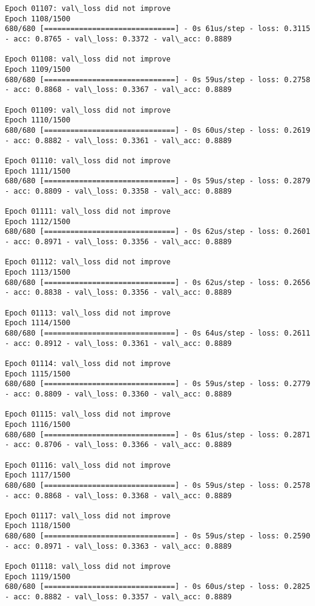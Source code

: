 \documentclass[11pt]{article}
\begin{document}
\begin{Verbatim}[commandchars=\\\{\}]
Epoch 01107: val\_loss did not improve
Epoch 1108/1500
680/680 [==============================] - 0s 61us/step - loss: 0.3115 - acc: 0.8765 - val\_loss: 0.3372 - val\_acc: 0.8889

Epoch 01108: val\_loss did not improve
Epoch 1109/1500
680/680 [==============================] - 0s 59us/step - loss: 0.2758 - acc: 0.8868 - val\_loss: 0.3367 - val\_acc: 0.8889

Epoch 01109: val\_loss did not improve
Epoch 1110/1500
680/680 [==============================] - 0s 60us/step - loss: 0.2619 - acc: 0.8882 - val\_loss: 0.3361 - val\_acc: 0.8889

Epoch 01110: val\_loss did not improve
Epoch 1111/1500
680/680 [==============================] - 0s 59us/step - loss: 0.2879 - acc: 0.8809 - val\_loss: 0.3358 - val\_acc: 0.8889

Epoch 01111: val\_loss did not improve
Epoch 1112/1500
680/680 [==============================] - 0s 62us/step - loss: 0.2601 - acc: 0.8971 - val\_loss: 0.3356 - val\_acc: 0.8889

Epoch 01112: val\_loss did not improve
Epoch 1113/1500
680/680 [==============================] - 0s 62us/step - loss: 0.2656 - acc: 0.8838 - val\_loss: 0.3356 - val\_acc: 0.8889

Epoch 01113: val\_loss did not improve
Epoch 1114/1500
680/680 [==============================] - 0s 64us/step - loss: 0.2611 - acc: 0.8912 - val\_loss: 0.3361 - val\_acc: 0.8889

Epoch 01114: val\_loss did not improve
Epoch 1115/1500
680/680 [==============================] - 0s 59us/step - loss: 0.2779 - acc: 0.8809 - val\_loss: 0.3360 - val\_acc: 0.8889

Epoch 01115: val\_loss did not improve
Epoch 1116/1500
680/680 [==============================] - 0s 61us/step - loss: 0.2871 - acc: 0.8706 - val\_loss: 0.3366 - val\_acc: 0.8889

Epoch 01116: val\_loss did not improve
Epoch 1117/1500
680/680 [==============================] - 0s 59us/step - loss: 0.2578 - acc: 0.8868 - val\_loss: 0.3368 - val\_acc: 0.8889

Epoch 01117: val\_loss did not improve
Epoch 1118/1500
680/680 [==============================] - 0s 59us/step - loss: 0.2590 - acc: 0.8971 - val\_loss: 0.3363 - val\_acc: 0.8889

Epoch 01118: val\_loss did not improve
Epoch 1119/1500
680/680 [==============================] - 0s 60us/step - loss: 0.2825 - acc: 0.8882 - val\_loss: 0.3357 - val\_acc: 0.8889


\end{Verbatim}
\end{document}
